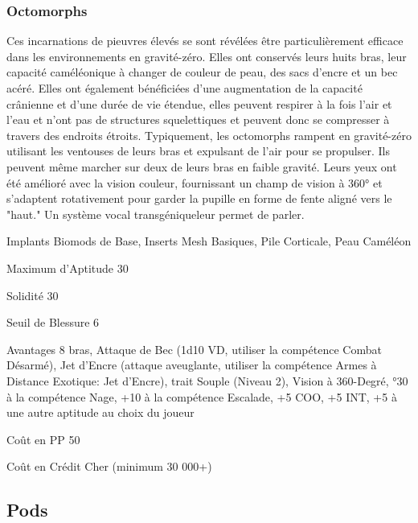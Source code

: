 \subsubsection{Octomorphs} \label{sec:starting-octomorphs} 

Ces incarnations de pieuvres élevés se sont révélées être particulièrement efficace dans les environnements en gravité-zéro. Elles ont conservés leurs huits bras, leur capacité caméléonique à changer de couleur de peau, des sacs d'encre et un bec acéré. Elles ont également bénéficiées d'une augmentation de la capacité crânienne et d'une durée de vie étendue, elles peuvent respirer à la fois l'air et l'eau et n'ont pas de structures squelettiques et peuvent donc se compresser à travers des endroits étroits. Typiquement, les octomorphs rampent en gravité-zéro utilisant les ventouses de leurs bras et expulsant de l'air pour se propulser. Ils peuvent même marcher sur deux de leurs bras en faible gravité. Leurs yeux ont été amélioré avec la vision couleur, fournissant un champ de vision à 360° et s'adaptent rotativement pour garder la pupille en forme de fente aligné vers le "haut." Un système vocal transgéniqueleur permet de parler. 

\begin{description*} \item[Implants] Biomods de Base, Inserts Mesh Basiques, Pile Corticale, Peau Caméléon\item[Maximum d'Aptitude] 30 \item[Solidité] 30 \item[Seuil de Blessure] 6 \item[Avantages] 8 bras, Attaque de Bec (1d10 VD, utiliser la compétence Combat Désarmé), Jet d'Encre (attaque aveuglante, utiliser la compétence Armes à Distance Exotique: Jet d'Encre), trait Souple (Niveau 2), Vision à 360-Degré, °30 à la compétence Nage, +10 à la compétence Escalade, +5 COO, +5 INT, +5 à une autre aptitude au choix du joueur\item[Coût en PP] 50 \item[Coût en Crédit] Cher (minimum 30 000+) \end{description*} 

\subsection{Pods} \label{sec:starting-pods} 

